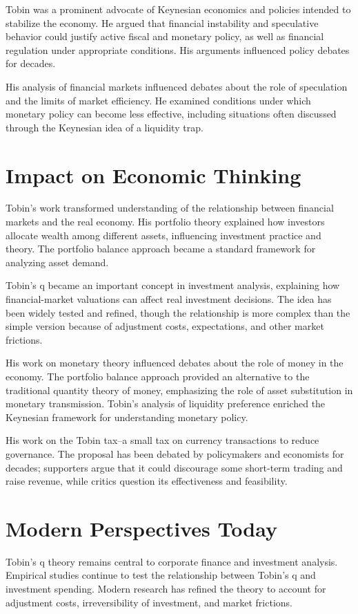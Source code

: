 Tobin was a prominent advocate of Keynesian economics and policies intended
to stabilize the economy. He argued that financial instability and speculative
behavior could justify active fiscal and monetary policy, as well as financial
regulation under appropriate conditions. His arguments influenced policy
debates for decades.

His analysis of financial markets influenced debates about the role of
speculation and the limits of market efficiency. He examined conditions under
which monetary policy can become less effective, including situations often
discussed through the Keynesian idea of a liquidity trap.

\section{Impact on Economic Thinking}
Tobin's work transformed understanding of the relationship between financial
markets and the real economy. His portfolio theory explained how investors
allocate wealth among different assets, influencing investment practice and
theory. The portfolio balance approach became a standard framework for
analyzing asset demand.

Tobin's q became an important concept in investment analysis, explaining how
financial-market valuations can affect real investment decisions. The idea
has been widely tested and refined, though the relationship is more complex
than the simple version because of adjustment costs, expectations, and other
market frictions.

His work on monetary theory influenced debates about the role of money in the
economy. The portfolio balance approach provided an alternative to the
traditional quantity theory of money, emphasizing the role of asset
substitution in monetary transmission. Tobin's analysis of liquidity preference
enriched the Keynesian framework for understanding monetary policy.

His work on the Tobin tax--a small tax on currency transactions to reduce
governance. The proposal has been debated by policymakers and economists for
decades; supporters argue that it could discourage some short-term trading
and raise revenue, while critics question its effectiveness and feasibility.

\section{Modern Perspectives Today}
Tobin's q theory remains central to corporate finance and investment analysis.
Empirical studies continue to test the relationship between Tobin's q and
investment spending. Modern research has refined the theory to account for
adjustment costs, irreversibility of investment, and market frictions.


